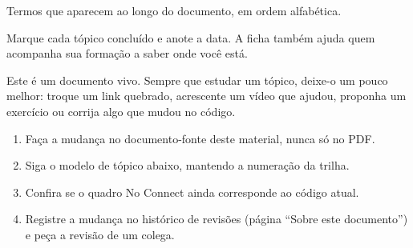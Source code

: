 \documentclass{nro-apostila}
\begin{document}






Termos que aparecem ao longo do documento, em ordem alfabética.
\par\vspace{2mm}
\begin{glossario}
  
\end{glossario}

Marque cada tópico concluído e anote a data. A ficha também ajuda quem acompanha sua formação a saber onde você está.
\par\vspace{2mm}
\fichaprogresso

Este é um documento vivo. Sempre que estudar um tópico, deixe-o um pouco melhor: troque um link quebrado, acrescente um vídeo que ajudou, proponha um exercício ou corrija algo que mudou no código.

\begin{enumerate}
  \item Faça a mudança no documento-fonte deste material, nunca só no PDF.
  \item Siga o modelo de tópico abaixo, mantendo a numeração da trilha.
  \item Confira se o quadro No Connect ainda corresponde ao código atual.
  \item Registre a mudança no histórico de revisões (página \enquote{Sobre este documento}) e peça a revisão de um colega.
\end{enumerate}
\end{document}
